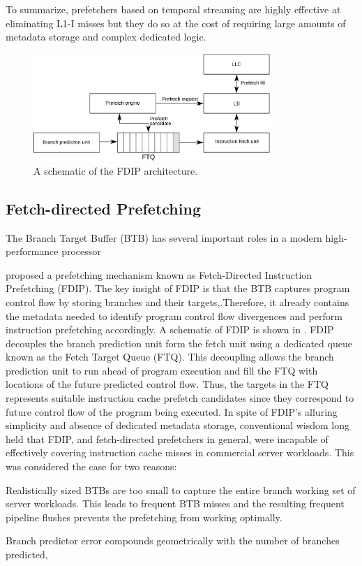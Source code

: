 \documentclass[../main.tex]{subfiles}
\begin{document}
\begin{refsection}
To summarize, prefetchers based on temporal streaming are highly
effective at eliminating L1-I misses but they do so at the cost of
requiring large amounts of metadata storage and complex dedicated
logic.

\begin{figure}[ht]
  \centering
  \includegraphics[width=0.8\textwidth]{figures/fdip1.pdf}
  \caption{\label{fig:fdip} A schematic of the FDIP architecture.}
\end{figure}

\subsection{Fetch-directed Prefetching}
The Branch Target Buffer (BTB) has several important roles in a modern high-performance processor 

\textcite{reinman99_fetch_direc_instr_prefet} proposed a prefetching
mechanism known as Fetch-Directed Instruction Prefetching (FDIP). The
key insight of FDIP is that the BTB captures program control flow by
storing branches and their targets,.Therefore, it already contains the
metadata needed to identify program control flow divergences and
perform instruction prefetching accordingly. A schematic of FDIP is
shown in . FDIP decouples the branch prediction unit
form the fetch unit using a dedicated queue known as the Fetch Target
Queue (FTQ). This decoupling allows the branch prediction unit to run
ahead of program execution and fill the FTQ with locations of the
future predicted control flow. Thus, the targets in the FTQ represents
suitable instruction cache prefetch candidates since they correspond
to future control flow of the program being executed. In spite of
FDIP's alluring simplicity and absence of dedicated metadata storage,
conventional wisdom long held that FDIP, and fetch-directed
prefetchers in general, were incapable of effectively covering
instruction cache misses in commercial server workloads. This was
considered the case for two reasons: \begin{inparaenum} \item
  Realistically sized BTBs are too small to capture the entire branch
  working set of server workloads. This leads to frequent BTB misses
  and the resulting frequent pipeline flushes prevents the prefetching
  from working optimally. \item Branch predictor error compounds
  geometrically with the number of branches predicted, 
\end{inparaenum}



\end{refsection}
\end{document}
